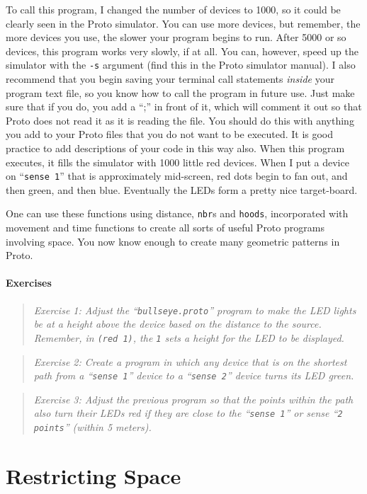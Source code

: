 \documentclass{article}
\newcommand\problem[1]{\begin{quote}{\em #1}\end{quote}}
\newcommand\var[1]{{\tt #1}}
\newcommand\qvar[1]{``{\tt #1}''}
\begin{document}
To call this program, I changed the number of devices to 1000, so it
could be clearly seen in the Proto simulator.  You can use more
devices, but remember, the more devices you use, the slower your
program begins to run.  After 5000 or so devices, this program works
very slowly, if at all.  You can, however, speed up the simulator with
the \var{-s} argument (find this in the Proto simulator manual).  I
also recommend that you begin saving your terminal call statements
{\em inside} your program text file, so you know how to call the
program in future use.  Just make sure that if you do, you add a “;”
in front of it, which will comment it out so that Proto does not read
it as it is reading the file.  You should do this with anything you
add to your Proto files that you do not want to be executed.  It is
good practice to add descriptions of your code in this way also.  When
this program executes, it fills the simulator with 1000 little red
devices.  When I put a device on \qvar{sense 1} that is approximately
mid-screen, red dots begin to fan out, and then green, and then blue.
Eventually the LEDs form a pretty nice target-board.

One can use these functions using distance, \var{nbr}s and
\var{hoods}, incorporated with movement and time functions to create
all sorts of useful Proto programs involving space.  You now know enough
to create many geometric patterns in Proto.

\paragraph{Exercises}

\problem{Exercise 1: Adjust the \qvar{bullseye.proto} program to make
  the LED lights be at a height above the device based on the distance
  to the source. Remember, in \var{(red 1)}, the \var{1} sets a height
  for the LED to be displayed.}

\problem{Exercise 2: Create a program in which any device that is on
  the shortest path from a \qvar{sense 1} device to a \qvar{sense 2}
  device turns its LED green.}

\problem{Exercise 3: Adjust the previous program so that the points
  within the path also turn their LEDs red if they are close to the
  \qvar{sense 1} or sense \qvar{2 points} (within 5 meters).}


\section{Restricting Space}
\label{s:mux}
\end{document}

